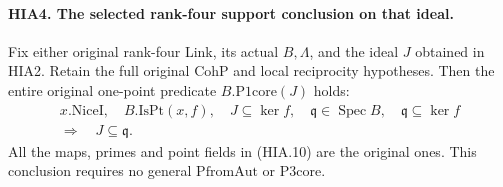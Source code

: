 \documentclass[11pt,a4paper]{article}
\numberwithin{equation}{section}
\theoremstyle{remark}\newtheorem{remark}[theorem]{Remark}
\begin{document}
\paragraph{HIA4. The selected rank-four support conclusion on that ideal.}
\label{claim:HIA4}
Fix either original rank-four Link, its actual \(B,\Lambda\),
and the ideal \(J\) obtained in HIA2.  Retain the full
original \(\mathrm{CohP}\) and local reciprocity hypotheses.
Then the entire original one-point predicate
\(B.\mathrm{P1core}(J)\) holds:
\[
 \begin{gathered}
 x.\mathrm{NiceI},\quad B.\mathrm{IsPt}(x,f),\quad
 J\subseteq\ker f,\quad
 \mathfrak q\in\operatorname{Spec}B,\quad
 \mathfrak q\subseteq\ker f\\
                       \Longrightarrow\quad J\subseteq\mathfrak q.
 \end{gathered}
 \tag{HIA.10}
\]
All the maps, primes and point fields in (HIA.10) are the
original ones.  This conclusion requires no general
\(\mathrm{PfromAut}\) or \(\mathrm{P3core}\).
\end{document}
